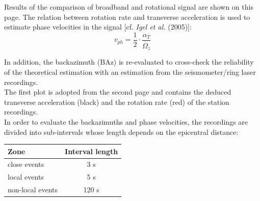 \documentclass[a4paper,10pt]{article}
\begin{document}
Results of the comparison of broadband and rotational signal are shown on this page. The relation between rotation rate and transverse acceleration is used to estimate phase velocities in the signal [cf. \textit{Igel et al.} (2005)]:\\

\begin{equation}
	v_{ph} = \frac{1}{2} \cdot \frac{\alpha_T}{\dot{\Omega_z}}
\end{equation}

In addition, the backazimuth (BAz) is re-evaluated to cross-check the reliability of the theoretical estimation with an estimation from the seismometer/ring laser recordings.\\
The first plot is adopted from the second page and contains the deduced transverse acceleration (black) and
the rotation rate (red) of the station recordings.\\
In order to evaluate the backazimuths and phase velocities, the recordings are divided into sub-intervals whose length depends on the epicentral distance:

\begin{table}[h!]
	\centering
	\begin{tabular}{lc}
		\textbf{Zone} & \textbf{Interval length}\\
		\hline
		close events & 3 s\\
		local events & 5 s\\
		non-local events & 120 s
	\end{tabular}
\end{table}
\end{document}
